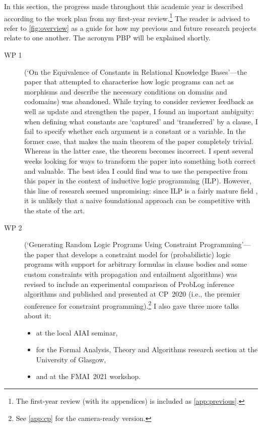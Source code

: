 \documentclass{article}
\begin{document}
{In this section, the progress made throughout this academic year is described
according to the work plan from my first-year review.\footnote{The first-year
review (with its appendices) is included as \cref{app:previous}.} The reader
is advised to refer to \cref{fig:overview} as a guide for how my previous and
future research projects relate to one another. The acronym PBP will be
explained shortly.

\begin{description}
\item[WP 1] (`On the Equivalence of Constants in Relational Knowledge
  Bases'---the paper that attempted to characterise how logic programs can act
  as morphisms and describe the necessary conditions on domains and codomains)
  was abandoned. While trying to consider reviewer feedback as well as update
  and strengthen the paper, I found an important ambiguity: when defining what
  constants are `captured' and `transferred' by a clause, I fail to specify
  whether each argument is a  constant or a variable. In the
  former case, that makes the main theorem of the paper completely trivial.
  Whereas in the latter case, the theorem becomes incorrect. I spent several
  weeks looking for ways to transform the paper into something both correct and
  valuable. The best idea I could find was to use the perspective from this
  paper in the context of inductive logic programming (ILP). However, this line
  of research seemed unpromising: since ILP is a fairly mature field
  \cite{DBLP:conf/ijcai/CropperDM20}, it is unlikely that a naive foundational
  approach can be competitive with the state of the art.
\item[WP 2] (`Generating Random Logic Programs Using Constraint
  Programming'---the paper that develops a constraint model for (probabilistic)
  logic programs with support for arbitrary formulas in clause bodies and some
  custom constraints with propagation and entailment algorithms) was revised to
  include an experimental comparison of ProbLog inference algorithms and
  published and presented at CP~2020 (i.e., the premier conference for
  constraint programming).\footnote{See \cref{app:cp} for the camera-ready
    version.} I also gave three more talks about it:
  \begin{itemize}
  \item at the local AIAI seminar,
  \item for the Formal Analysis, Theory and Algorithms research section at the
    University of Glasgow,
  \item and at the FMAI~2021 workshop.

\end{itemize}
\end{description}}
\end{document}
